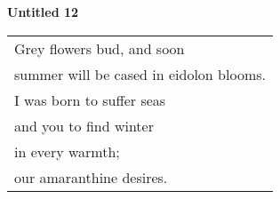 \documentclass{article}
\begin{document}
\begin{center}
\textbf{Untitled 12} \\
\vspace*{2ex}
\begin{tabular}{l}
Grey flowers bud, and soon \\
summer will be cased in eidolon blooms. \\
I was born to suffer seas \\
and you to find winter \\
in every warmth; \\
our amaranthine desires. \\
\end{tabular}
\end{center}
\end{document}
